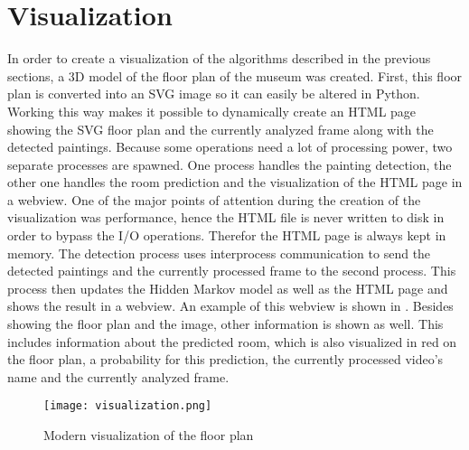 \section{Visualization}

In order to create a visualization of the algorithms described in the previous sections, a 3D model of the floor plan of the museum was created. First, this floor plan is converted into an SVG image so it can easily be altered in Python. Working this way makes it possible to dynamically create an HTML page showing the SVG floor plan and the currently analyzed frame along with the detected paintings. Because some operations need a lot of processing power, two separate processes are spawned. One process handles the painting detection, the other one handles the room prediction and the visualization of the HTML page in a webview. One of the major points of attention during the creation of the visualization was performance, hence the HTML file is never written to disk in order to bypass the I/O operations. Therefor the HTML page is always kept in memory. The detection process uses interprocess communication to send the detected paintings and the currently processed frame to the second process. This process then updates the Hidden Markov model as well as the HTML page and shows the result in a webview. An example of this webview is shown in . Besides showing the floor plan and the image, other information is shown as well. This includes information about the predicted room, which is also visualized in red on the floor plan, a probability for this prediction, the currently processed video's name and the currently analyzed frame.

\begin{figure}
    \centering
    \texttt{[image: visualization.png]}
    \label{fig:webview}
    \caption{Modern visualization of the floor plan}
\end{figure}
